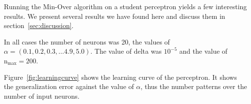 Running the Min-Over algorithm on a student perceptron yields a few interesting results. We present several results we have found here and discuss them in section~\ref{sec:discussion}. 

In all cases the number of neurons was 20, the values of $\alpha = (0.1, 0.2, 0.3, \ldots 4.9, 5.0)$. The value of delta was $10^{-5}$ and the value of $\text{n}_{\text{max}} = 200$.


Figure~\ref{fig:learningcurve} shows the learning curve of the perceptron. It shows the generalization error against the value of $\alpha$, thus the number patterns over the number of input neurons. 

